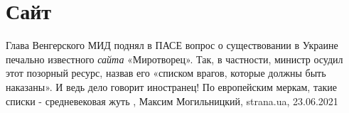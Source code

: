  
 
 
 
 
\chapter{Сайт}
\label{sec:slova.sajt}

Глава Венгерского МИД поднял в ПАСЕ вопрос о существовании в Украине печально
известного \emph{сайта} «Миротворец». Так, в частности, министр осудил этот
позорный ресурс, назвав его «списком врагов, которые должны быть наказаны». И
ведь дело говорит иностранец! По европейским меркам, такие списки -
средневековая жуть
, 
Максим Могильницкий, strana.ua, 23.06.2021

